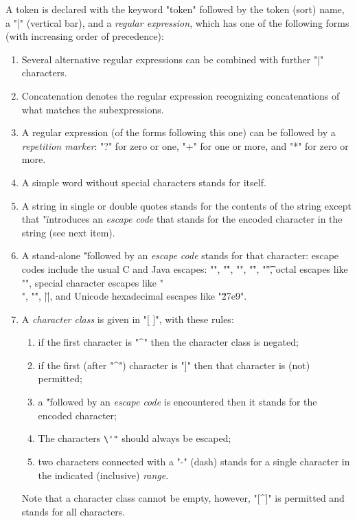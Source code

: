 \documentclass[11pt]{article} %
\begin{document}
\begin{manual}\label{man:token}
  A token is declared with the keyword "token" followed by the token (sort) name, a "|" (vertical
  bar), and a \emph{regular expression}, which has one of the following forms (with increasing order
  of precedence):
  \begin{enumerate}

  \item Several alternative regular expressions can be combined with further "|" characters.

  \item Concatenation denotes the regular expression recognizing concatenations of what matches the
    subexpressions.

  \item A regular expression (of the forms following this one) can be followed by a \emph{repetition
      marker}: "?" for zero or one, "+" for one or more, and "*" for zero or more.

  \item A simple word without special characters stands for itself.

  \item A string in single or double quotes stands for the contents of the string except that "\"
    introduces an \emph{escape code} that stands for the encoded character in the string (see next item).

  \item A stand-alone "\" followed by an \emph{escape code} stands for that character: escape codes
    include the usual C and Java escapes: "\n", "\r", "\a", "\f", "\t", octal escapes like "",
    special character escapes like "\\", "\'", \hacsc|\"|, and Unicode hexadecimal escapes like
    "\u27e9".

  \item A \emph{character class} is given in "[ ]", with these rules:
   \begin{enumerate}
    \item if the first character is "^" then the character class is negated;
    \item if the first (after "^") character is "]" then that character is (not) permitted;
    \item a "\" followed by an \emph{escape code} is encountered then it stands for the encoded
      character;
    \item The characters \verb|\'"| should always be escaped;
    \item two characters connected with a "-" (dash) stands for a single character in the indicated
      (inclusive) \emph{range}.
    \end{enumerate}
    Note that a character class cannot be empty, however, "[^]" is permitted and stands for all
    characters.
    


\end{enumerate}
\end{manual}
\end{document}
